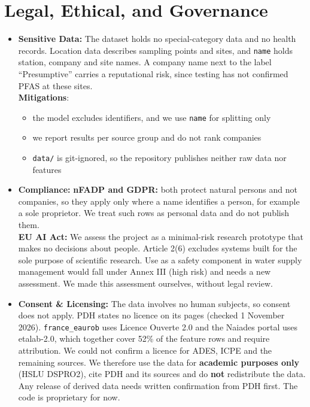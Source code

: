 \documentclass[11pt, a4paper]{article}
\newcommand{\code}[1]{\texttt{#1}}
\begin{document}
\section{Legal, Ethical, and Governance}
\begin{itemize}
    \item \textbf{Sensitive Data:} The dataset holds no special-category data and no health records. Location data describes sampling points and sites, and \code{name} holds station, company and site names. A company name next to the label ``Presumptive'' carries a reputational risk, since testing has not confirmed PFAS at these sites.\\
    \textbf{Mitigations}:
    \begin{itemize}
        \item the model excludes identifiers, and we use \code{name} for splitting only
        \item we report results per source group and do not rank companies
        \item \code{data/} is git-ignored, so the repository publishes neither raw data nor features
    \end{itemize}
    \item \textbf{Compliance:} \textbf{nFADP and GDPR:} both protect natural persons and not companies, so they apply only where a name identifies a person, for example a sole proprietor. We treat such rows as personal data and do not publish them.\\
    \textbf{EU AI Act:} We assess the project as a minimal-risk research prototype that makes no decisions about people. Article 2(6) excludes systems built for the sole purpose of scientific research. Use as a safety component in water supply management would fall under Annex III (high risk) and needs a new assessment. We made this assessment ourselves, without legal review.
    \item \textbf{Consent \& Licensing:} The data involves no human subjects, so consent does not apply. PDH states no licence on its pages (checked 1 November 2026). \code{france\_eaurob} uses Licence Ouverte 2.0 and the Naiades portal uses etalab-2.0, which together cover 52\% of the feature rows and require attribution. We could not confirm a licence for ADES, ICPE and the remaining sources. We therefore use the data for \textbf{academic purposes only} (HSLU DSPRO2), cite PDH and its sources and do \textbf{not} redistribute the data. Any release of derived data needs written confirmation from PDH first. The code is proprietary for now.
\end{itemize}
\end{document}
